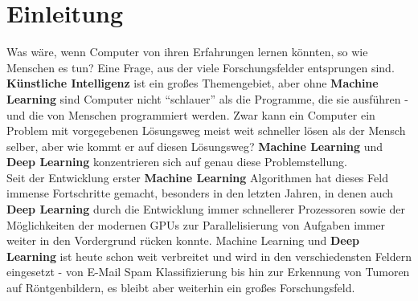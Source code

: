 \chapter{Einleitung}
Was w\"are, wenn Computer von ihren Erfahrungen lernen k\"onnten, so wie Menschen es tun? Eine Frage, aus der viele Forschungsfelder entsprungen sind. \textbf{K\"unstliche Intelligenz} ist ein gro{\ss}es Themengebiet, aber ohne \textbf{Machine Learning} sind Computer nicht "`schlauer"' als die Programme, die sie ausf\"uhren - und die von Menschen programmiert werden. Zwar kann ein Computer ein Problem mit vorgegebenen L\"osungsweg meist weit schneller l\"osen als der Mensch selber, aber wie kommt er auf diesen L\"osungsweg? \textbf{Machine Learning} und\textbf{ Deep Learning} konzentrieren sich auf genau diese Problemstellung.\\
Seit der Entwicklung erster \textbf{Machine Learning} Algorithmen hat dieses Feld immense Fortschritte gemacht, besonders in den letzten Jahren, in denen auch \textbf{Deep Learning} durch die Entwicklung immer schnellerer Prozessoren sowie der M\"oglichkeiten der modernen GPUs zur Parallelisierung von Aufgaben immer weiter in den Vordergrund r\"ucken konnte.
Machine Learning und \textbf{Deep Learning} ist heute schon weit verbreitet und wird in den verschiedensten Feldern eingesetzt - von  E-Mail Spam Klassifizierung bis hin zur Erkennung von Tumoren auf R\"ontgenbildern, es bleibt aber weiterhin ein gro{\ss}es Forschungsfeld.


